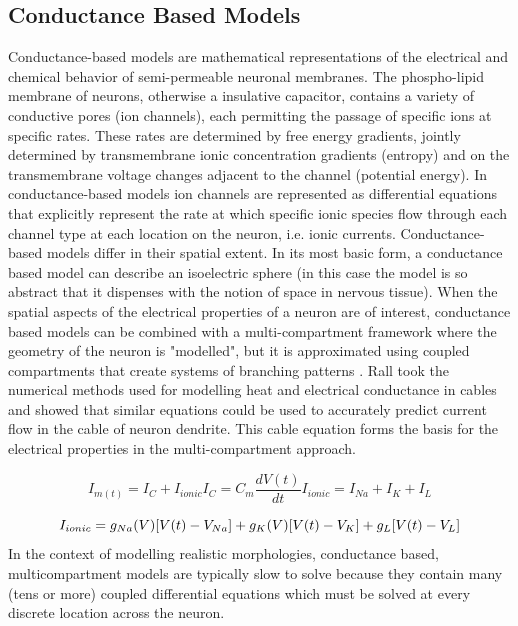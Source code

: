 \subsection{Conductance Based Models}
Conductance-based models are mathematical representations of the electrical and chemical behavior of semi-permeable neuronal membranes.
The phospho-lipid membrane of neurons, otherwise a insulative capacitor, contains a variety of conductive pores (ion channels), each permitting the passage of specific ions at specific rates.
These rates are determined by free energy gradients, jointly determined by transmembrane ionic concentration gradients (entropy) and on the transmembrane voltage changes adjacent to the channel (potential energy).
In conductance-based models ion channels are represented as differential equations that explicitly represent the rate at which specific ionic species flow through each channel type at each location on the neuron, i.e. ionic currents.
Conductance-based models differ in their spatial extent. In its most basic form, a conductance based model can describe an isoelectric sphere (in this case the model is so abstract that it dispenses with the notion of space in nervous tissue).
When the spatial aspects of the electrical properties of a neuron are of interest, conductance based models can be combined with a multi-compartment framework where the geometry of the neuron is "modelled", but it is approximated using coupled compartments that create systems of branching patterns \citep{rall1962electrophysiology}.
Rall took the numerical methods used for modelling heat and electrical conductance in cables and showed that similar equations could be used to accurately predict current flow in the cable of neuron dendrite. This cable equation forms the basis for the electrical properties in the multi-compartment approach.
\\
\begin{center}
\begin{equation}
I_{m(t)}=I_{C}+I_{ionic} 
I_{C}=C_{m}\frac{dV(t)}{dt} 
I_{ionic}=I_{Na}+I_{K}+I_{L}
\end{equation}
\end{center}
\begin{equation}
I_{ionic}=\\
g_{Na}(V)[V(t)-V_{Na}]+\\
g_{K}(V)[V(t)-V_{K}]+\\g_{L}[V(t)-V_{L}] 
\end{equation}
In the context of modelling realistic morphologies, conductance based, multicompartment models are typically slow to solve because they contain many (tens or more) coupled differential equations which must be solved at every discrete location across the neuron.

